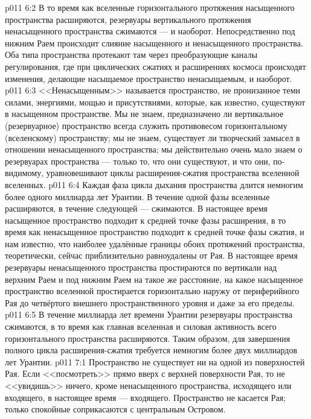 \vs p011 6:2 В то время как вселенные горизонтального протяжения насыщенного пространства расширяются, резервуары вертикального протяжения ненасыщенного пространства сжимаются --- и наоборот. Непосредственно под нижним Раем происходит слияние насыщенного и ненасыщенного пространства. Оба типа пространства протекают там через преобразующие каналы регулирования, где при циклических сжатиях и расширениях космоса происходят изменения, делающие насыщаемое пространство ненасыщаемым, и наоборот.
\vs p011 6:3 \pc <<Ненасыщенным>> называется пространство, не пронизанное теми силами, энергиями, мощью и присутствиями, которые, как известно, существуют в насыщенном пространстве. Мы не знаем, предназначено ли вертикальное (резервуарное) пространство всегда служить противовесом горизонтальному (вселенскому) пространству; мы не знаем, существует ли творческий замысел в отношении ненасыщенного пространства; мы действительно очень мало знаем о резервуарах пространства --- только то, что они существуют, и что они, по\hyp{}видимому, уравновешивают циклы расширения\hyp{}сжатия пространства вселенной вселенных.
\vs p011 6:4 \pc Каждая фаза цикла дыхания пространства длится немногим более одного миллиарда лет Урантии. В течение одной фазы вселенные расширяются, в течение следующей --- сжимаются. В настоящее время насыщенное пространство подходит к средней точке фазы расширения, в то время как ненасыщенное пространство подходит к средней точке фазы сжатия, и нам известно, что наиболее удалённые границы обоих протяжений пространства, теоретически, сейчас приблизительно равноудалены от Рая. В настоящее время резервуары ненасыщенного пространства простираются по вертикали над верхним Раем и под нижним Раем на такое же расстояние, на какое насыщенное пространство вселенной простирается горизонтально наружу от периферийного Рая до четвёртого внешнего пространственного уровня и даже за его пределы.
\vs p011 6:5 В течение миллиарда лет времени Урантии резервуары пространства сжимаются, в то время как главная вселенная и силовая активность всего горизонтального пространства расширяются. Таким образом, для завершения полного цикла расширения\hyp{}сжатия требуется немногим более двух миллиардов лет Урантии.
\vs p011 7:1 Пространство не существует ни на одной из поверхностей Рая. Если <<посмотреть>> прямо вверх с верхней поверхности Рая, то не <<увидишь>> ничего, кроме ненасыщенного пространства, исходящего или входящего, в настоящее время --- входящего. Пространство не касается Рая; только спокойные  соприкасаются с центральным Островом.
